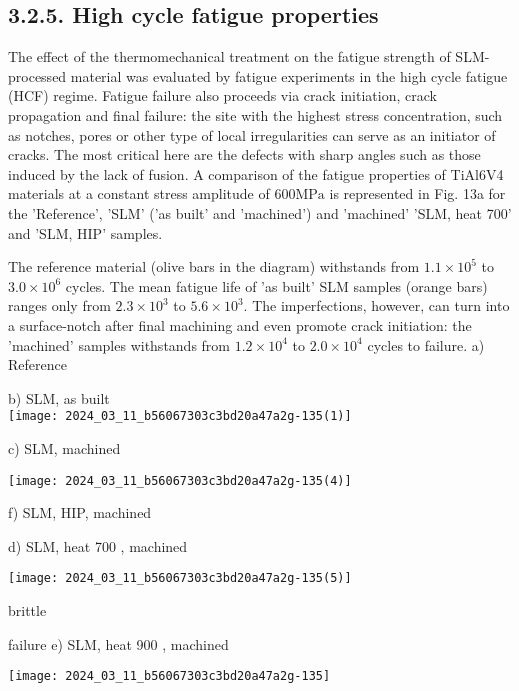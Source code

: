 \documentclass[10pt]{article}
\begin{document}
\subsection*{3.2.5. High cycle fatigue properties}
The effect of the thermomechanical treatment on the fatigue strength of SLM-processed material was evaluated by fatigue experiments in the high cycle fatigue (HCF) regime. Fatigue failure also proceeds via crack initiation, crack propagation and final failure: the site with the highest stress concentration, such as notches, pores or other type of local irregularities can serve as an initiator of cracks. The most critical here are the defects with sharp angles such as those induced by the lack of fusion. A comparison of the fatigue properties of TiAl6V4 materials at a constant stress amplitude of $600 \mathrm{MPa}$ is represented in Fig. 13a for the 'Reference', 'SLM' ('as built' and 'machined') and 'machined' 'SLM, heat 700' and 'SLM, HIP' samples.

The reference material (olive bars in the diagram) withstands from $1.1 \times 10^{5}$ to $3.0 \times 10^{6}$ cycles. The mean fatigue life of 'as built' SLM samples (orange bars) ranges only from $2.3 \times 10^{3}$ to $5.6 \times 10^{3}$. The imperfections, however, can turn into a surface-notch after final machining and even promote crack initiation: the 'machined' samples withstands from $1.2 \times 10^{4}$ to $2.0 \times 10^{4}$ cycles to failure. a) Reference

b) SLM, as built\\
\texttt{[image: 2024\_03\_11\_b56067303c3bd20a47a2g-135(1)]}

c) SLM, machined

\begin{center}
\texttt{[image: 2024\_03\_11\_b56067303c3bd20a47a2g-135(4)]}
\end{center}

f) SLM, HIP, machined

d) SLM, heat 700 , machined

\begin{center}
\texttt{[image: 2024\_03\_11\_b56067303c3bd20a47a2g-135(5)]}
\end{center}

brittle

failure e) SLM, heat 900 , machined

\begin{center}
\texttt{[image: 2024\_03\_11\_b56067303c3bd20a47a2g-135]}
\end{center}
\end{document}
